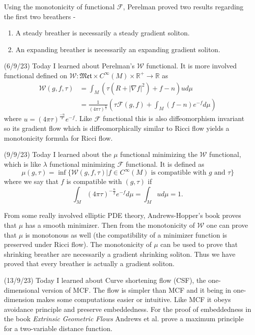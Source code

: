 \documentclass[12pt,a4paper]{article}
\newcommand{\R}{\mathbb{R}}
\begin{document}
Using the monotonicity of functional $ \mathcal{F}$, Perelman proved two results regarding the first two breathers - \begin{enumerate}
   \item A steady breather is necessarily a steady gradient soliton.
   \item An expanding breather is necessarily an expanding gradient soliton.
\end{enumerate}

(6/9/23) Today I learned about Perelman's $ \mathcal{W} $ functional. It is more involved functional defined on $\mathcal{W} : \mathfrak{Met} \times C^{\infty}(M) \times \R^{+} \to \R $ as 
\begin{align*}
  \mathcal{W} (g,f, \tau) &= \int_{M} (\tau(R+ |\nabla f|^{2})+ f-n )u d \mu \\
   & = \frac{1}{(4 \pi \tau)^{\frac{n}{2}}} \left(\tau \mathcal{F}(g,f)+ \int_{M}(f-n)e^{-f}d \mu\right)
\end{align*}
where $ u = (4 \pi \tau)^{\frac{-n}{2}}e^{-f} $. Like $ \mathcal{F} $ functional this is also diffeomorphism invariant so its gradient flow which is diffeomorphically similar to Ricci flow yields a monotonicity formula for Ricci flow.


(9/9/23) Today I learned about the $ \mu $ functional minimizing the $ \mathcal{W} $ functional, which is like $ \lambda $ functional minimizing $ \mathcal{F} $ functional. It is defined as 
\[ \mu(g, \tau) = \inf \{\mathcal{W}(g,f, \tau) | f \in C^{\infty}(M) \text{ is compatible with }g \text{ and } \tau\} \]
where we say that $ f $ is compatible with $ (g, \tau) $ if 
\[ \int_{M} (4 \pi \tau)^{- \frac{n}{2}}e^{-f}d \mu = \int_{M} u d \mu = 1.\]

From some really involved elliptic PDE theory, Andrews-Hopper's book proves that $ \mu $ has a smooth minimizer. Then from the monotonicity of $ \mathcal{W} $ one can prove that $ \mu $ is monotonous as well (the compatibility of a minimizer function is preserved under Ricci flow). The monotonicity of $ \mu $ can be used to prove that shrinking breather are necessarily a gradient shrinking soliton. Thus we have proved that every breather is actually a gradient soliton.

(13/9/23) Today I learned about Curve shortening flow (CSF), the one-dimensional version of MCF. The flow is simpler than MCF and it being in one-dimension makes some computations easier or intuitive. Like MCF it obeys avoidance principle and preserve embeddedness. For the proof of embeddedness in the book \textit{Extrinsic Geometric Flows}  Andrews et al. prove a maximum principle for a two-variable distance function. 
\end{document}
